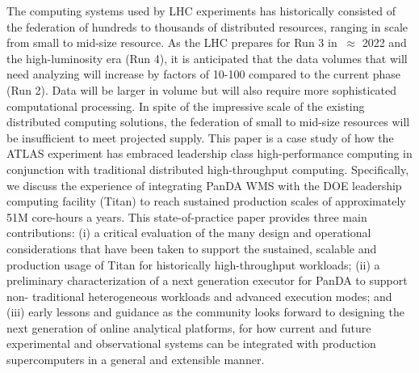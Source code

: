 The computing systems used by LHC experiments has historically consisted of
the federation of hundreds to thousands of distributed resources,  ranging in
scale from small to mid-size resource. As the LHC prepares for Run 3 in
$~\approx$ 2022 and the high-luminosity era (Run 4), it is anticipated that
the data volumes that will need analyzing will increase by factors of 10-100
compared to the current phase (Run 2). Data will be larger in volume but will
also require more sophisticated computational processing.  In spite of the
impressive scale of the existing distributed computing solutions, the
federation of small to mid-size resources will be insufficient to meet
projected supply. This paper is a case study of how the ATLAS experiment has
embraced leadership class high-performance computing in conjunction with
traditional distributed high-throughput computing. Specifically, we discuss
the experience of integrating PanDA WMS with the DOE leadership computing
facility (Titan) to reach sustained production scales of approximately 51M
core-hours a years. This state-of-practice paper provides three main
contributions:  (i) a critical evaluation of the many design and operational
considerations that have been taken to support the sustained, scalable and
production usage of Titan for historically high-throughput workloads; (ii) a
preliminary characterization of a next generation executor   for PanDA to
support non- traditional heterogeneous workloads and advanced execution modes;
and (iii) early lessons and guidance as the community looks forward to
designing the next generation of online analytical platforms, for how current
and future experimental and observational systems can be integrated with
production supercomputers in a general and extensible manner.
